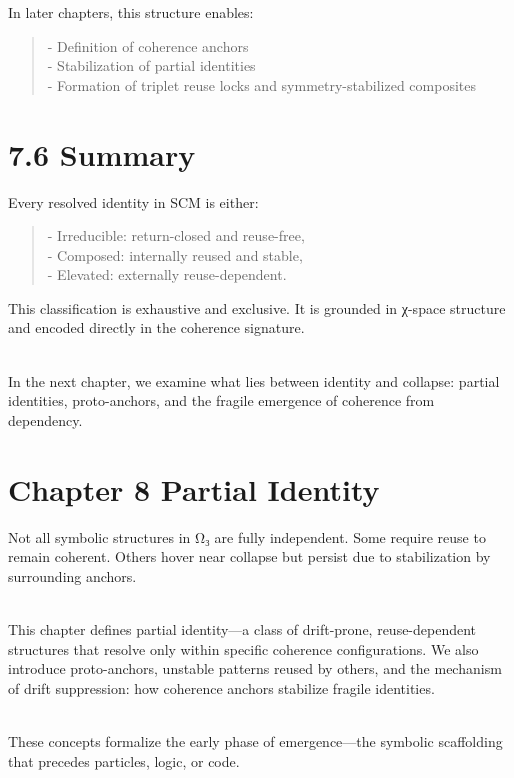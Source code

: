 In later chapters, this structure enables:

\begin{quote}
- Definition of coherence anchors\\
- Stabilization of partial identities\\
- Formation of triplet reuse locks and symmetry-stabilized composites
\end{quote}

\section{7.6 \textbar{} Summary}\label{summary-5}

Every resolved identity in SCM is either:

\begin{quote}
- Irreducible: return-closed and reuse-free,\\
- Composed: internally reused and stable,\\
- Elevated: externally reuse-dependent.
\end{quote}

This classification is exhaustive and exclusive. It is grounded in
χ-space structure and encoded directly in the coherence signature.\\
\strut \\
In the next chapter, we examine what lies between identity and collapse:
partial identities, proto-anchors, and the fragile emergence of
coherence from dependency.

\section{Chapter 8 \textbar{} Partial
Identity}\label{chapter-8-partial-identity}

Not all symbolic structures in Ω₃ are fully independent. Some require
reuse to remain coherent. Others hover near collapse but persist due to
stabilization by surrounding anchors.\\
\strut \\
This chapter defines partial identity---a class of drift-prone,
reuse-dependent structures that resolve only within specific coherence
configurations. We also introduce proto-anchors, unstable patterns
reused by others, and the mechanism of drift suppression: how coherence
anchors stabilize fragile identities.\\
\strut \\
These concepts formalize the early phase of emergence---the symbolic
scaffolding that precedes particles, logic, or code.

